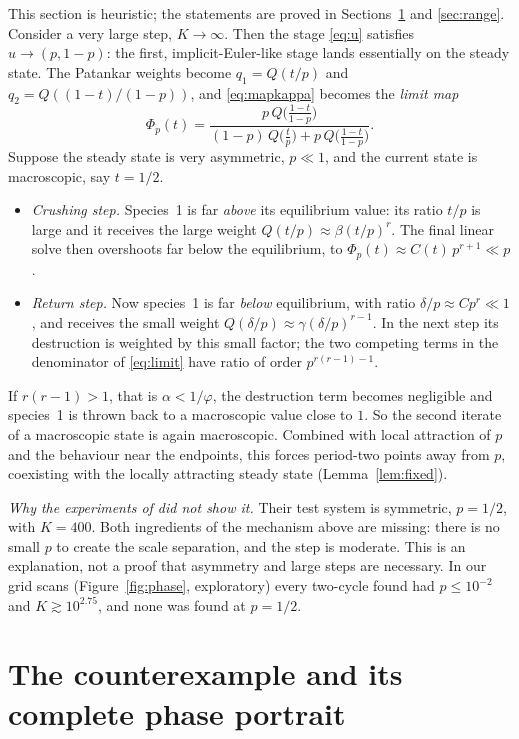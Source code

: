 \documentclass[11pt,a4paper]{article}
\theoremstyle{plain}
\theoremstyle{definition}
\begin{document}
This section is heuristic; the statements are proved in Sections~\ref{sec:witness} and \ref{sec:range}. Consider a very large step, $K\to\infty$. Then the stage \eqref{eq:u} satisfies $u\to(p,1-p)$: the first, implicit-Euler-like stage lands essentially on the steady state. The Patankar weights become $q_1=Q(t/p)$ and $q_2=Q((1-t)/(1-p))$, and \eqref{eq:mapkappa} becomes the \emph{limit map}
\begin{equation}\label{eq:limit}
 \Phi_p(t)=\frac{p\,Q\bigl(\frac{1-t}{1-p}\bigr)}{(1-p)\,Q\bigl(\frac tp\bigr)+p\,Q\bigl(\frac{1-t}{1-p}\bigr)}.
\end{equation}
Suppose the steady state is very asymmetric, $p\ll1$, and the current state is macroscopic, say $t=1/2$.
\begin{itemize}[itemsep=1pt]
\item \emph{Crushing step.} Species~1 is far \emph{above} its equilibrium value: its ratio $t/p$ is large and it receives the large weight $Q(t/p)\approx\beta(t/p)^r$. The final linear solve then overshoots far below the equilibrium, to $\Phi_p(t)\approx C(t)\,p^{r+1}\ll p$.
\item \emph{Return step.} Now species~1 is far \emph{below} equilibrium, with ratio $\delta/p\approx Cp^r\ll1$, and receives the small weight $Q(\delta/p)\approx\gamma(\delta/p)^{r-1}$. In the next step its destruction is weighted by this small factor; the two competing terms in the denominator of \eqref{eq:limit} have ratio of order $p^{r(r-1)-1}$.
\end{itemize}
If $r(r-1)>1$, that is $\alpha<1/\varphi$, the destruction term becomes negligible and species~1 is thrown back to a macroscopic value close to $1$. So the second iterate of a macroscopic state is again macroscopic. Combined with local attraction of $p$ and the behaviour near the endpoints, this forces period-two points away from $p$, coexisting with the locally attracting steady state (Lemma~\ref{lem:fixed}).

\emph{Why the experiments of \cite{IKMS2024} did not show it.} Their test system is symmetric, $p=1/2$, with $K=400$. Both ingredients of the mechanism above are missing: there is no small $p$ to create the scale separation, and the step is moderate. This is an explanation, not a proof that asymmetry and large steps are necessary. In our grid scans (Figure~\ref{fig:phase}, exploratory) every two-cycle found had $p\le10^{-2}$ and $K\gtrsim10^{2.75}$, and none was found at $p=1/2$.

\section{The counterexample and its complete phase portrait}\label{sec:witness}
\end{document}
